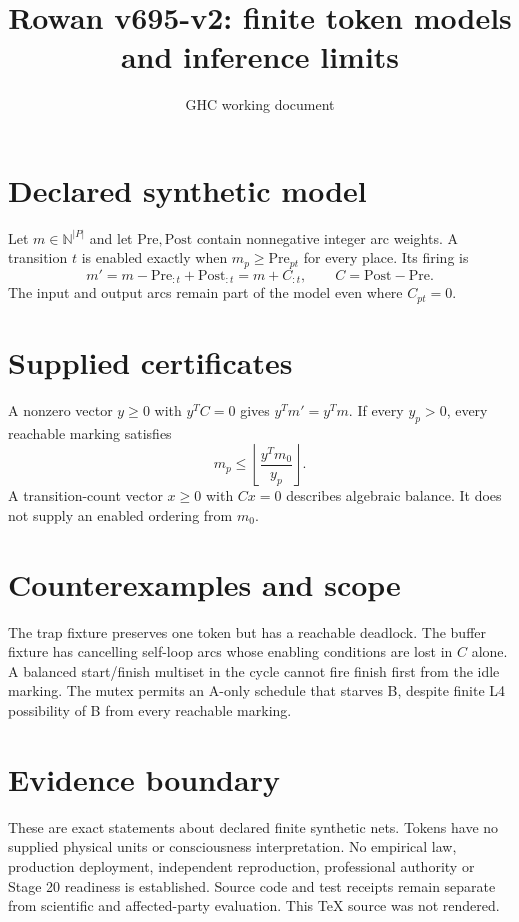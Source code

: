 \documentclass{article}
\title{Rowan v695-v2: finite token models and inference limits}
\author{GHC working document}
\begin{document}
\maketitle
\section{Declared synthetic model}
Let $m\in\mathbb{N}^{|P|}$ and let $\mathrm{Pre},\mathrm{Post}$ contain nonnegative integer arc weights. A transition $t$ is enabled exactly when $m_p\geq\mathrm{Pre}_{pt}$ for every place. Its firing is
\[m'=m-\mathrm{Pre}_{:t}+\mathrm{Post}_{:t}=m+C_{:t},\qquad C=\mathrm{Post}-\mathrm{Pre}.\]
The input and output arcs remain part of the model even where $C_{pt}=0$.
\section{Supplied certificates}
A nonzero vector $y\geq0$ with $y^TC=0$ gives $y^Tm'=y^Tm$. If every $y_p>0$, every reachable marking satisfies
\[m_p\leq \left\lfloor\frac{y^Tm_0}{y_p}\right\rfloor.\]
A transition-count vector $x\geq0$ with $Cx=0$ describes algebraic balance. It does not supply an enabled ordering from $m_0$.
\section{Counterexamples and scope}
The trap fixture preserves one token but has a reachable deadlock. The buffer fixture has cancelling self-loop arcs whose enabling conditions are lost in $C$ alone. A balanced start/finish multiset in the cycle cannot fire finish first from the idle marking. The mutex permits an A-only schedule that starves B, despite finite L4 possibility of B from every reachable marking.
\section{Evidence boundary}
These are exact statements about declared finite synthetic nets. Tokens have no supplied physical units or consciousness interpretation. No empirical law, production deployment, independent reproduction, professional authority or Stage 20 readiness is established. Source code and test receipts remain separate from scientific and affected-party evaluation. This TeX source was not rendered.
\end{document}
